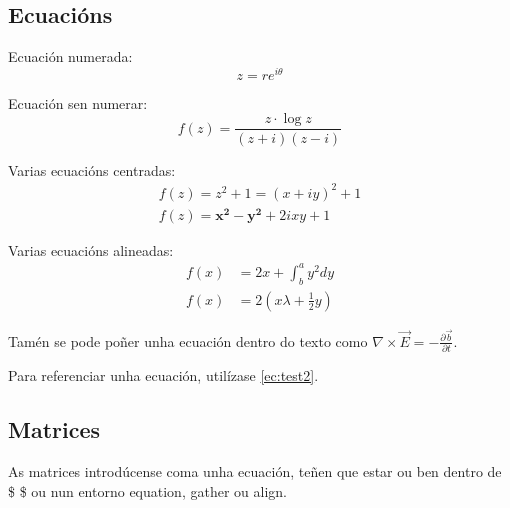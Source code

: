 \documentclass[12pt, titlepage]{article}
\begin{document}
    \subsection{Ecuacións}

    Ecuación numerada:
    \begin{equation} \label{ec:test}
        z = r e^{i \theta}
    \end{equation}


    Ecuación sen numerar:
    \begin{equation*}
        f(z) = \frac{z \cdot \log{z}}{(z + i)(z - i)}
    \end{equation*}

    Varias ecuacións centradas:
    \begin{gather}
        f(z) = z^2 + 1 = (x + iy)^2 + 1 \nonumber \\ %
        f(z) = \mathbf{x^2 - y^2} + 2ixy + 1 \label{ec:test2} %
    \end{gather}

    Varias ecuacións alineadas:
    \begin{align} %
        f(x) &= 2x + \int^a_b y^2 dy \label{ec:test3} \\
        f(x) &= 2 (x\lambda + \frac{1}{2}y) \label{ec:test4}
    \end{align}

    Tamén se pode poñer unha ecuación dentro do texto como $\nabla \times \vec{E} = -\frac{\partial{\vec{b}}}{\partial{t}}$\cite{griffiths_2018}.

    Para referenciar unha ecuación, utilízase \ref{ec:test2}.

    \subsection{Matrices}

    As matrices introdúcense coma unha ecuación, teñen que estar ou ben dentro de \$ \$ ou nun entorno equation, gather ou align.
\end{document}
